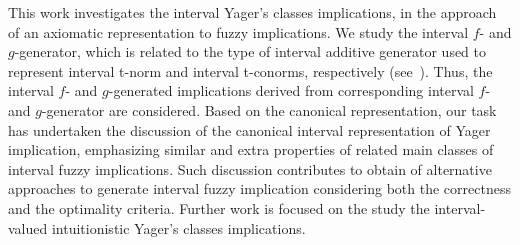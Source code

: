 \documentclass[12pt]{article}
\theoremstyle{plain}
\theoremstyle{remark}
\theoremstyle{definition}
\theoremstyle{proposition}
\begin{document}
This work investigates the interval Yager's classes implications, in the approach of an axiomatic representation to fuzzy implications.  We study the interval $f$- and $g$-generator, which is related to the type of interval additive generator used to represent interval t-norm and interval t-conorms, respectively (see~\cite{BDSR11}). Thus, the interval $f$- and $g$-generated implications derived from corresponding interval $f$- and $g$-generator are considered. Based on the canonical representation, our task has undertaken the discussion of the canonical interval representation of  Yager implication, emphasizing similar and extra properties of related main classes of interval fuzzy implications. Such discussion contributes to obtain of alternative approaches to generate interval fuzzy implication considering both the correctness and the optimality criteria. Further work is focused on the study the interval-valued intuitionistic Yager's classes implications.\vspace{-0.5cm}
\end{document}
